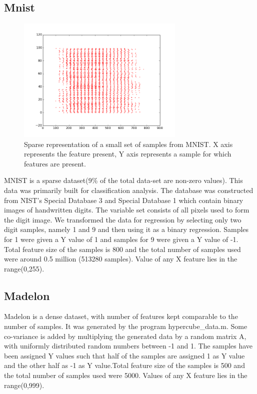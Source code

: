 \documentclass{sigplanconf}
\begin{document}
\subsection{Mnist}
\begin{figure}[ht!]
\centering
\includegraphics[width=80mm]{mnist_scatter.png}
\caption{Sparse representation of a small set of samples from MNIST. X axis represents the feature present, Y axis represents a sample for which features are present. }
\label{overflow}
\end{figure}

MNIST is a sparse dataset(9\% of the total data-set are non-zero values). This data was primarily built for classification analysis. The database was constructed from NIST's Special Database 3 and Special Database 1 which contain binary images of handwritten digits. The variable set consists of all pixels used to form the digit image. We transformed the data for regression by selecting only two digit samples, namely 1 and 9 and then using it as a binary regression. Samples for 1 were given a Y value of 1 and samples for 9 were given a Y value of -1. Total feature size of the samples is 800 and the total number of samples used were around 0.5 million (513280 samples). Value of any X feature lies in the range(0,255).

\subsection{Madelon}
Madelon is a dense dataset, with number of features kept comparable to the number of samples. It was generated by the program hypercube\_data.m. Some co-variance is added by multiplying the generated data by a random matrix A, with uniformly distributed random numbers between -1 and 1. The samples have been assigned Y values such that half of the samples are assigned 1 as Y value and the other half as -1 as Y value.Total feature size of the samples is 500 and the total number of samples used were 5000. Values of any X feature lies in the range(0,999).
\end{document}
